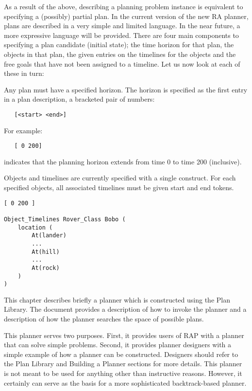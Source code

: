 As a result of the above, describing a planning problem instance is
equivalent to specifying a (possibly) partial plan.  In the current
version of the new RA planner, plans are described in a very simple
and limited language.  In the near future, a more expressive language
will be provided.  There are four main components to specifying a plan
candidate (initial state); the time horizon for that plan, the objects
in that plan, the given entries on the timelines for the objects and
the free goals that have not been assigned to a timeline.  Let us now 
look at each of these in turn:

Any plan must have a specified horizon.  The horizon is specified as 
the first entry in a plan description, a bracketed pair of numbers:
\begin{verbatim}
   [<start> <end>]
\end{verbatim}
For example:
\begin{verbatim}
   [ 0 200]
\end{verbatim}
indicates that the planning horizon extends from time 0 to time 200 
(inclusive).

Objects and timelines are currently specified with a single construct. 
For each specified objects, all associated timelines must be given
start and end tokens.

\begin{verbatim}
[ 0 200 ]

Object_Timelines Rover_Class Bobo (
    location (
        At(lander)
        ...
        At(hill)
        ...
        At(rock)
    )
)

\end{verbatim}







This chapter describes briefly a planner which is constructed using the Plan Library.
The document provides a description of how to invoke the planner and a description
of how the planner searches the space of possible plans.

This planner serves two purposes.  First, it provides users of RAP with a planner
that can solve simple problems.  Second, it provides planner designers with a simple
example of how a planner can be constructed.  Designers should refer to the Plan Library
and Building a Planner sections for more details.  This planner is not meant to
be used for anything other than instructive reasons.  However, it certainly can serve
as the basis for a more sophisticated backtrack-based planner.


